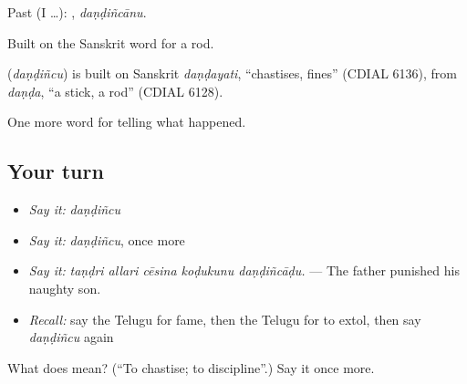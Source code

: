 Past (I …): , \emph{daṇḍiñcānu}.

Built on the Sanskrit word for a rod.

\begin{cousinweb}
\textbf{} (\emph{daṇḍiñcu}) is built on Sanskrit \emph{daṇḍayati}, \textquotedblleft{}chastises, fines\textquotedblright{} (CDIAL 6136), from \emph{daṇḍa}, \textquotedblleft{}a stick, a rod\textquotedblright{} (CDIAL 6128).
\end{cousinweb}

\begin{grammarlens}[title={What you've built}]
One more word for telling what happened.
\end{grammarlens}

\subsection*{Your turn}
\begin{itemize}
\raggedright
  \item \emph{Say it:} \emph{daṇḍiñcu}
  \item \emph{Say it:} \emph{daṇḍiñcu}, once more
  \item \emph{Say it:} \emph{taṇḍri allari cēsina koḍukunu daṇḍiñcāḍu.} — The father punished his naughty son.
  \item \emph{Recall:} say the Telugu for fame, then the Telugu for to extol, then say \emph{daṇḍiñcu} again
\end{itemize}

\begin{tcolorbox}[breakable,colback=teal!4,colframe=teal!35!black,title={Before you move on}]
What does  mean? (\textquotedblleft{}To chastise; to discipline\textquotedblright{}.) Say it once more.
\end{tcolorbox}
